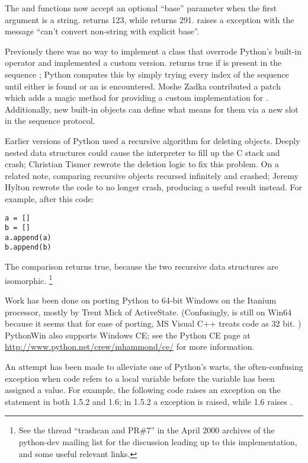 \documentclass{howto}
\begin{document}
{{The  and  functions now accept an
optional ``base'' parameter when the first argument is a string.
 returns 123, while  returns
291.   raises a  exception
with the message ``can't convert non-string with explicit base''.

Previously there was no way to implement a class that overrode
Python's built-in  operator and implemented a custom
version.   returns true if  is
present in the sequence ; Python computes this by simply
trying every index of the sequence until either  is found or
an  is encountered.  Moshe Zadka contributed a
patch which adds a  magic method for providing a
custom implementation for . Additionally, new built-in objects
can define what  means for them via a new slot in the sequence
protocol.

Earlier versions of Python used a recursive algorithm for deleting
objects.  Deeply nested data structures could cause the interpreter to
fill up the C stack and crash; Christian Tismer rewrote the deletion
logic to fix this problem.  On a related note, comparing recursive
objects recursed infinitely and crashed; Jeremy Hylton rewrote the
code to no longer crash, producing a useful result instead.  For
example, after this code:

\begin{verbatim}
a = []
b = []
a.append(a)
b.append(b)
\end{verbatim}

The comparison  returns true, because the two recursive
data structures are isomorphic.
\footnote{See the thread ``trashcan and PR\#7'' in the April 2000 archives of the python-dev mailing list for the discussion leading up to this implementation, and some useful relevant links.
}

Work has been done on porting Python to 64-bit Windows on the Itanium
processor, mostly by Trent Mick of ActiveState.  (Confusingly,  is still  on
Win64 because it seems that for ease of porting, MS Visual C++ treats code
as 32 bit.
)  PythonWin also supports Windows CE; see the Python CE page at
\url{http://www.python.net/crew/mhammond/ce/} for more information.

An attempt has been made to alleviate one of Python's warts, the
often-confusing  exception when code refers to a
local variable before the variable has been assigned a value.  For
example, the following code raises an exception on the 
statement in both 1.5.2 and 1.6; in 1.5.2 a 
exception is raised, while 1.6 raises .

}}
\end{document}
